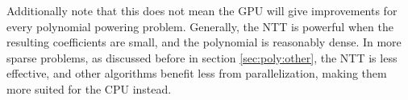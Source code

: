 Additionally note that this does not mean the GPU will give 
improvements for every polynomial powering 
problem. Generally, the NTT is powerful when the resulting 
coefficients are small, and the polynomial is reasonably dense. 
In more sparse problems, as discussed before in section \ref{sec:poly:other}, 
the NTT is less effective, and other algorithms benefit less 
from parallelization, making them more 
suited for the CPU instead.
